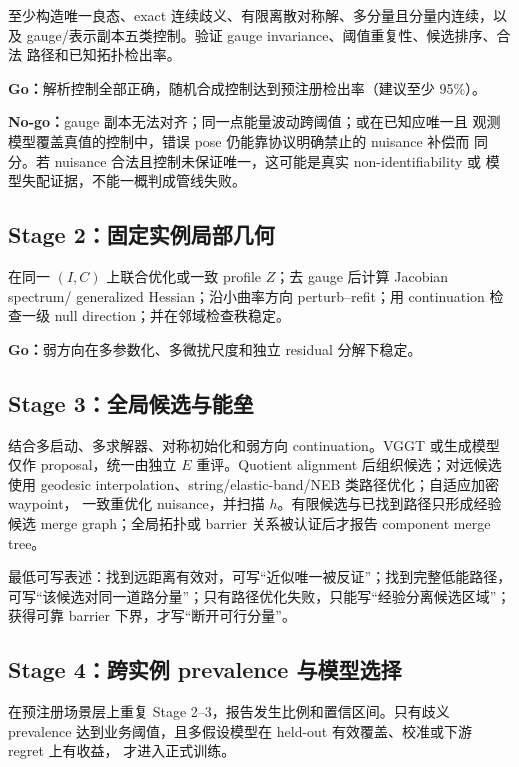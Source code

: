 \documentclass[UTF8,a4paper,11pt]{ctexart}
\begin{document}
至少构造唯一良态、exact 连续歧义、有限离散对称解、多分量且分量内连续，以及
gauge/表示副本五类控制。验证 gauge invariance、阈值重复性、候选排序、合法
路径和已知拓扑检出率。

\textbf{Go：}解析控制全部正确，随机合成控制达到预注册检出率（建议至少 95\%）。

\textbf{No-go：}gauge 副本无法对齐；同一点能量波动跨阈值；或在已知应唯一且
观测模型覆盖真值的控制中，错误 pose 仍能靠协议明确禁止的 nuisance 补偿而
同分。若 nuisance 合法且控制未保证唯一，这可能是真实 non-identifiability 或
模型失配证据，不能一概判成管线失败。

\subsection{Stage 2：固定实例局部几何}

在同一 $(I,C)$ 上联合优化或一致 profile $Z$；去 gauge 后计算 Jacobian spectrum/
generalized Hessian；沿小曲率方向 perturb--refit；用 continuation 检查一级
null direction；并在邻域检查秩稳定。

\textbf{Go：}弱方向在多参数化、多微扰尺度和独立 residual 分解下稳定。

\subsection{Stage 3：全局候选与能垒}

结合多启动、多求解器、对称初始化和弱方向 continuation。VGGT 或生成模型仅作
proposal，统一由独立 $E$ 重评。Quotient alignment 后组织候选；对远候选使用
geodesic interpolation、string/elastic-band/NEB 类路径优化；自适应加密 waypoint，
一致重优化 nuisance，并扫描 $h$。有限候选与已找到路径只形成经验候选 merge
graph；全局拓扑或 barrier 关系被认证后才报告 component merge tree。

最低可写表述：找到远距离有效对，可写“近似唯一被反证”；找到完整低能路径，
可写“该候选对同一道路分量”；只有路径优化失败，只能写“经验分离候选区域”；
获得可靠 barrier 下界，才写“断开可行分量”。

\subsection{Stage 4：跨实例 prevalence 与模型选择}

在预注册场景层上重复 Stage 2--3，报告发生比例和置信区间。只有歧义 prevalence
达到业务阈值，且多假设模型在 held-out 有效覆盖、校准或下游 regret 上有收益，
才进入正式训练。
\end{document}
